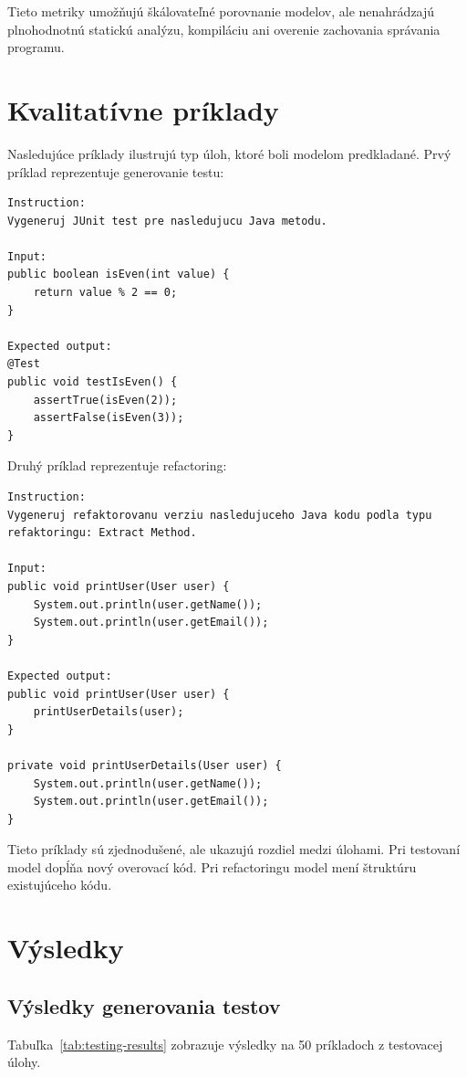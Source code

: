 \documentclass[11pt,a4paper]{article}
\begin{document}
Tieto metriky umožňujú škálovateľné porovnanie modelov, ale nenahrádzajú plnohodnotnú statickú analýzu, kompiláciu ani overenie zachovania správania programu.

\section{Kvalitatívne príklady}

Nasledujúce príklady ilustrujú typ úloh, ktoré boli modelom predkladané. Prvý príklad reprezentuje generovanie testu:

\begin{lstlisting}
Instruction:
Vygeneruj JUnit test pre nasledujucu Java metodu.

Input:
public boolean isEven(int value) {
    return value % 2 == 0;
}

Expected output:
@Test
public void testIsEven() {
    assertTrue(isEven(2));
    assertFalse(isEven(3));
}
\end{lstlisting}

Druhý príklad reprezentuje refactoring:

\begin{lstlisting}
Instruction:
Vygeneruj refaktorovanu verziu nasledujuceho Java kodu podla typu refaktoringu: Extract Method.

Input:
public void printUser(User user) {
    System.out.println(user.getName());
    System.out.println(user.getEmail());
}

Expected output:
public void printUser(User user) {
    printUserDetails(user);
}

private void printUserDetails(User user) {
    System.out.println(user.getName());
    System.out.println(user.getEmail());
}
\end{lstlisting}

Tieto príklady sú zjednodušené, ale ukazujú rozdiel medzi úlohami. Pri testovaní model dopĺňa nový overovací kód. Pri refactoringu model mení štruktúru existujúceho kódu.

\section{Výsledky}

\subsection{Výsledky generovania testov}

Tabuľka~\ref{tab:testing-results} zobrazuje výsledky na 50 príkladoch z testovacej úlohy.
\end{document}
